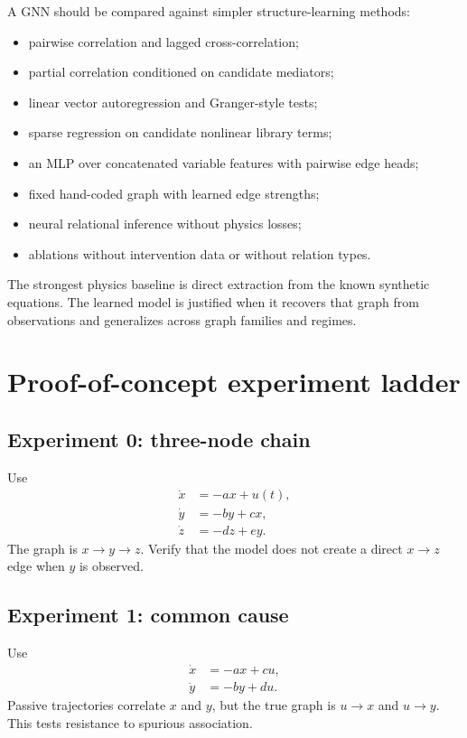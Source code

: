 \documentclass[11pt]{article}
\begin{document}
A GNN should be compared against simpler structure-learning methods:
\begin{itemize}[leftmargin=1.5em]
    \item pairwise correlation and lagged cross-correlation;
    \item partial correlation conditioned on candidate mediators;
    \item linear vector autoregression and Granger-style tests;
    \item sparse regression on candidate nonlinear library terms;
    \item an MLP over concatenated variable features with pairwise edge heads;
    \item fixed hand-coded graph with learned edge strengths;
    \item neural relational inference without physics losses;
    \item ablations without intervention data or without relation types.
\end{itemize}
The strongest physics baseline is direct extraction from the known synthetic equations. The learned model is justified when it recovers that graph from observations and generalizes across graph families and regimes.

\section{Proof-of-concept experiment ladder}

\subsection{Experiment 0: three-node chain}

Use
\begin{align}
\dot{x}&=-a x+u(t),\\
\dot{y}&=-b y+c x,\\
\dot{z}&=-d z+e y.
\end{align}
The graph is \(x\rightarrow y\rightarrow z\). Verify that the model does not create a direct \(x\rightarrow z\) edge when \(y\) is observed.

\subsection{Experiment 1: common cause}

Use
\begin{align}
\dot{x}&=-a x+c u,\\
\dot{y}&=-b y+d u.
\end{align}
Passive trajectories correlate \(x\) and \(y\), but the true graph is \(u\rightarrow x\) and \(u\rightarrow y\). This tests resistance to spurious association.
\end{document}
